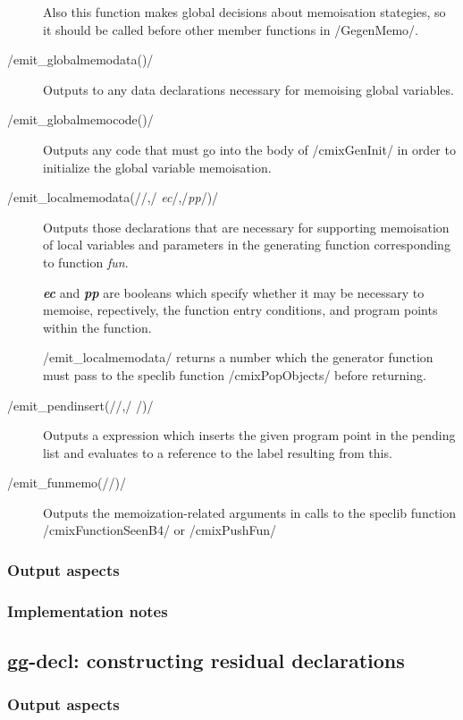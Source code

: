 \begin{docpart}
\begin{description}
	Also this function makes global decisions about memoisation
	stategies, so it should be called before other member
	functions in /GegenMemo/.
\item[/emit_globalmemodata()/]
	Outputs to \Pgen any data declarations necessary for memoising
	global variables.
\item[/emit_globalmemocode()/]
	Outputs any code that must go into the body of /cmixGenInit/
	in order to initialize the global variable memoisation.
\item[/emit_localmemodata(/\textit{\mdseries{fun}}/,/%
	\textit{ec}/,/\textit{pp}/)/]
	Outputs those declarations that are necessary for supporting
	memoisation of local variables and parameters in the
	generating function corresponding to \coreC function
	\textit{fun}.

	\textit{\bfseries{ec}} and \textit{\bfseries{pp}} are booleans
	which specify whether it may be necessary to memoise,
	repectively, the function entry conditions, and program points
	within the function.

	/emit_localmemodata/ returns a number which the generator
	function must pass to the speclib function /cmixPopObjects/
	before returning.
\item[/emit_pendinsert(/\textit{\mdseries{fun}}/,/%
	\textit{\mdseries{bb}}/)/]
	Outputs a \Pgen expression which inserts the given program
	point in the pending list and evaluates to a reference to
	the label resulting from this.
\item[/emit_funmemo(/\textit{\mdseries{fun}}/)/]
	Outputs the memoization-related arguments in calls to
	the speclib function /cmixFunctionSeenB4/ or /cmixPushFun/
\end{description}

\subsubsection{Output aspects}

\subsubsection{Implementation notes}

\subsection{gg-decl: constructing residual declarations}

\subsubsection{Output aspects}


\end{docpart}

